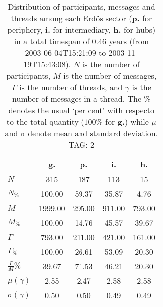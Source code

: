 \begin{table}[h!]
\begin{center}
\begin{tabular}{| l || c | c | c | c |}\hline
 & {\bf g.} & {\bf p.} & {\bf i.} & {\bf h.} \\\hline\hline
$N$ & 315  & 187  & 113  & 15 \\
$N_{\%}$ & 100.00  & 59.37  & 35.87  & 4.76 \\\hline
$M$ & 1999.00  & 295.00  & 911.00  & 793.00 \\
$M_{\%}$ & 100.00  & 14.76  & 45.57  & 39.67 \\\hline
$\Gamma$ & 793.00  & 211.00  & 421.00  & 161.00 \\
$\Gamma_{\%}$ & 100.00  & 26.61  & 53.09  & 20.30 \\\hline
$\frac{\Gamma}{M}\%$ & 39.67  & 71.53  & 46.21  & 20.30 \\
$\mu(\gamma)$ & 2.55  & 2.47  & 2.58  & 2.58 \\
$\sigma(\gamma)$ & 0.50  & 0.50  & 0.49  & 0.49 \\\hline
\end{tabular}
\caption{Distribution of participants, messages and threads among each Erd\"os sector ({\bf p.} for periphery, {\bf i.} for intermediary, 
    {\bf h.} for hubs) in a total timespan of 0.46 years (from 2003-06-04T15:21:09 to 2003-11-19T15:43:08). $N$ is the number of participants, $M$ is the number of messages, $\Gamma$ is the number of threads, and $\gamma$ is the number of messages in a thread.
    The \% denotes the usual `per cent' with respecto to the total quantity ($100\%$ for {\bf g.})
    while $\mu$ and $\sigma$ denote mean and standard deviation. TAG: 2}
\end{center}
\end{table}